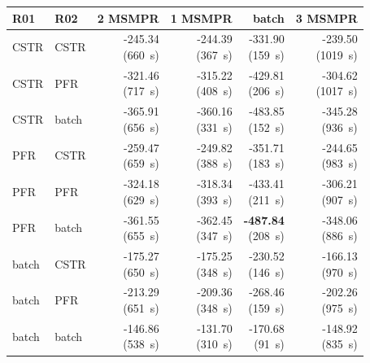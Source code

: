 \begin{tabular}{@{}llrrrr@{}}\toprule
R01 & R02 & 2 MSMPR & 1 MSMPR & batch & 3 MSMPR\\\midrule
CSTR & CSTR & \makecell{-245.34\\(660~s)} & \makecell{-244.39\\(367~s)} & \makecell{-331.90\\(159~s)} & \makecell{-239.50\\(1019~s)} \\
CSTR & PFR & \makecell{-321.46\\(717~s)} & \makecell{-315.22\\(408~s)} & \makecell{-429.81\\(206~s)} & \makecell{-304.62\\(1017~s)} \\
CSTR & batch & \makecell{-365.91\\(656~s)} & \makecell{-360.16\\(331~s)} & \makecell{-483.85\\(152~s)} & \makecell{-345.28\\(936~s)} \\
PFR & CSTR & \makecell{-259.47\\(659~s)} & \makecell{-249.82\\(388~s)} & \makecell{-351.71\\(183~s)} & \makecell{-244.65\\(983~s)} \\
PFR & PFR & \makecell{-324.18\\(629~s)} & \makecell{-318.34\\(393~s)} & \makecell{-433.41\\(211~s)} & \makecell{-306.21\\(907~s)} \\
PFR & batch & \makecell{-361.55\\(655~s)} & \makecell{-362.45\\(347~s)} & \makecell{\textbf{-487.84}\\(208~s)} & \makecell{-348.06\\(886~s)} \\
batch & CSTR & \makecell{-175.27\\(650~s)} & \makecell{-175.25\\(348~s)} & \makecell{-230.52\\(146~s)} & \makecell{-166.13\\(970~s)} \\
batch & PFR & \makecell{-213.29\\(651~s)} & \makecell{-209.36\\(348~s)} & \makecell{-268.46\\(159~s)} & \makecell{-202.26\\(975~s)} \\
batch & batch & \makecell{-146.86\\(538~s)} & \makecell{-131.70\\(310~s)} & \makecell{-170.68\\(91~s)} & \makecell{-148.92\\(835~s)} \\
\bottomrule\end{tabular}
